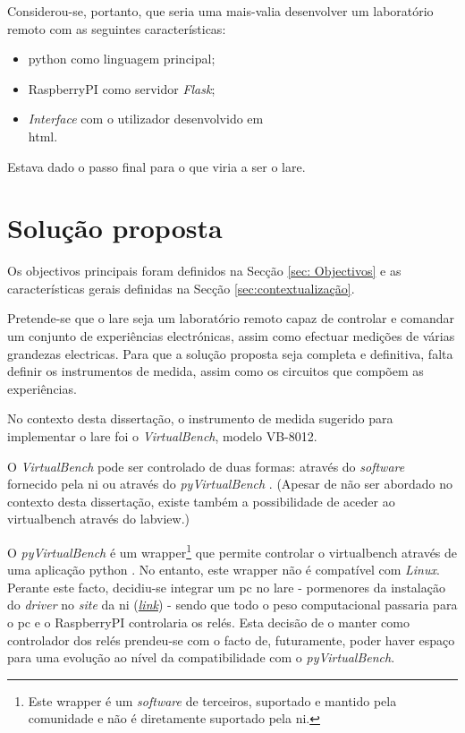 Considerou-se, portanto, que seria uma mais-valia desenvolver um \acrshort{laboratório remoto} com as seguintes características:
\begin{itemize}
	\item \gls{python} como linguagem principal;
	\item \gls{RaspberryPI} como servidor \textit{Flask};
	\item \textit{Interface} com o utilizador desenvolvido em \\
	      \acrfull{html}.
\end{itemize}

Estava dado o passo final para o que viria a ser o \acrshort{lare}.

\section{Solução proposta}
\label{sec:solucaoproposta}
Os objectivos principais foram definidos na Secção \ref{sec: Objectivos} e as características gerais definidas na Secção \ref{sec:contextualização}.

Pretende-se que o \acrshort{lare} seja um \acrshort{laboratório remoto} capaz de controlar e comandar um conjunto de experiências electrónicas, assim como efectuar medições de várias grandezas electricas. Para que a solução proposta seja completa e definitiva, falta definir os instrumentos de medida, assim como os circuitos que compõem as experiências.

No contexto desta dissertação, o instrumento de medida sugerido para implementar o \acrshort{lare} foi o \textit{VirtualBench}, modelo VB-8012.

O \textit{VirtualBench} pode ser controlado de duas formas: através do \textit{software} fornecido pela \acrshort{ni} ou através do \textit{pyVirtualBench} \cite{AutomatingVB}. (Apesar de não ser abordado no contexto desta dissertação, existe também a possibilidade de aceder ao \acrshort{virtualbench} através do \acrshort{labview}.)

O \textit{pyVirtualBench} é um \gls{wrapper}\footnote{Este \gls{wrapper} é um \textit{software} de terceiros, suportado e mantido pela comunidade e não é diretamente suportado pela \acrshort{ni}.} que permite controlar o \acrshort{virtualbench} através de uma aplicação \gls{python} \cite{pyvirtualbench}. No entanto, este \gls{wrapper} não é compatível com \textit{Linux}.
Perante este facto, decidiu-se integrar um \acrshort{pc} no \acrshort{lare} - pormenores da instalação do \textit{driver} no \textit{site} da \acrshort{ni} (\href{https://knowledge.ni.com/KnowledgeArticleDetails?id=kA00Z000000kHUFSA2&l=pt-PT}{\textit{link}}) - sendo que todo o peso computacional passaria para o \acrshort{pc} e o \gls{RaspberryPI} controlaria os relés. Esta decisão de o manter como controlador dos relés prendeu-se com o facto de, futuramente, poder haver espaço para uma evolução ao nível da compatibilidade com o \textit{pyVirtualBench}.

